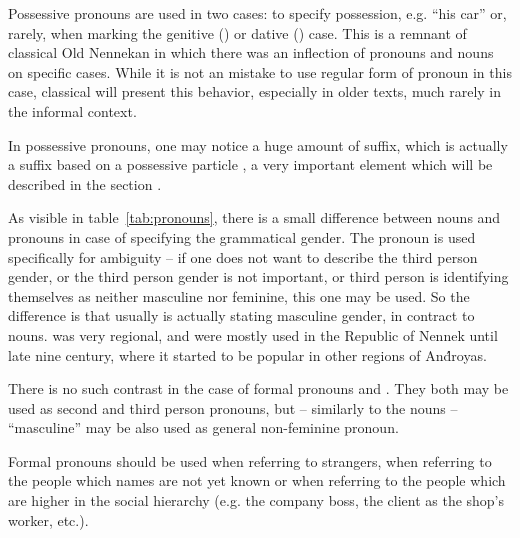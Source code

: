 Possessive pronouns are used in two cases: to specify possession, e.g. ``his
car'' or, rarely, when marking the genitive (\Gen{}) or dative (\Dat{}) case.
This is a remnant of classical Old Nennekan in which there was an inflection of
pronouns and nouns on specific cases. While it is not an mistake to use regular
form of pronoun in this case, classical \ardo will present this behavior,
especially in older texts, much rarely in the informal context.


In possessive pronouns, one may notice a huge amount of  suffix, which
is actually a suffix based on a possessive particle , a very
important element which will be described in the section
.

As visible in table~\ref{tab:pronouns}, there is a small difference between
nouns and pronouns in case of specifying the grammatical gender. The pronoun
 is used specifically for ambiguity -- if one does not want to
describe the third person gender, or the third person gender is not important,
or third person is identifying themselves as neither masculine nor feminine,
this one may be used. So the difference is that usually  is
actually stating masculine gender, in contract to nouns.  was very
regional, and were mostly used in the Republic of Nennek until late nine
century, where it started to be popular in other regions of And́royas.

There is no such contrast in the case of formal pronouns  and
. They both may be used as second and third person pronouns,
but -- similarly to the nouns -- ``masculine''  may be also used as
general non-feminine pronoun.

Formal pronouns should be used when referring to strangers, when referring to
the people which names are not yet known or when referring to the people which
are higher in the social hierarchy (e.g. the company boss, the client as the
shop's worker, etc.).



